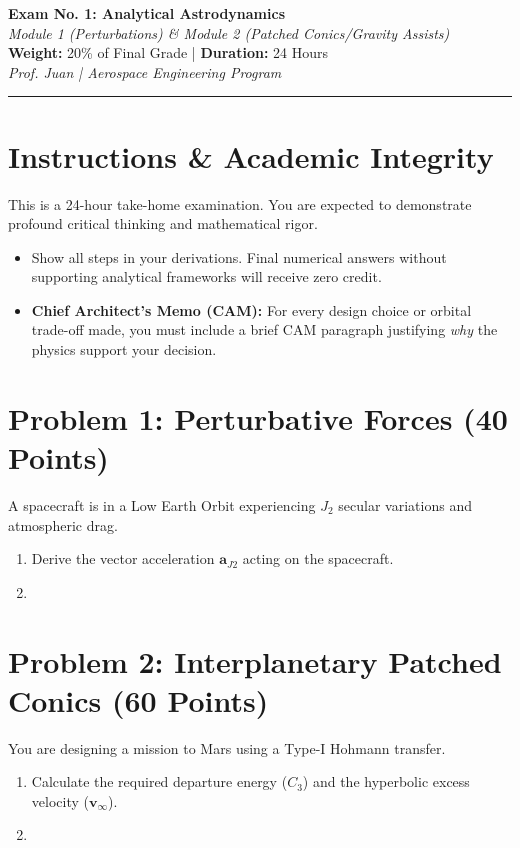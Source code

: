 \documentclass[11pt, letterpaper]{article}
\begin{document}
\begin{center}
    {\Large \textbf{Exam No. 1: Analytical Astrodynamics}} \\
    \vspace{0.2cm}
    {\large \textit{Module 1 (Perturbations) \& Module 2 (Patched Conics/Gravity Assists)}} \\
    \vspace{0.4cm}
    \textbf{Weight:} 20\% of Final Grade | \textbf{Duration:} 24 Hours \\
    \textit{Prof. Juan | Aerospace Engineering Program}
\end{center}

\hrule
\vspace{0.5cm}

\section*{Instructions \& Academic Integrity}
This is a 24-hour take-home examination. You are expected to demonstrate profound critical thinking and mathematical rigor. 
\begin{itemize}
    \item Show all steps in your derivations. Final numerical answers without supporting analytical frameworks will receive zero credit.
    \item \textbf{Chief Architect's Memo (CAM):} For every design choice or orbital trade-off made, you must include a brief CAM paragraph justifying \textit{why} the physics support your decision.
\end{itemize}

\section*{Problem 1: Perturbative Forces (40 Points)}
A spacecraft is in a Low Earth Orbit experiencing $J_2$ secular variations and atmospheric drag. 
\begin{enumerate}
    \item[(a)] Derive the vector acceleration $\boldsymbol{a}_{J2}$ acting on the spacecraft.
    \item[(b)] [Insert specific problem parameters here...]
\end{enumerate}

\section*{Problem 2: Interplanetary Patched Conics (60 Points)}
You are designing a mission to Mars using a Type-I Hohmann transfer.
\begin{enumerate}
    \item[(a)] Calculate the required departure energy ($C_3$) and the hyperbolic excess velocity ($\boldsymbol{v}_\infty$).
    \item[(b)] [Insert gravity assist or phasing parameters here...]
\end{enumerate}
\end{document}
